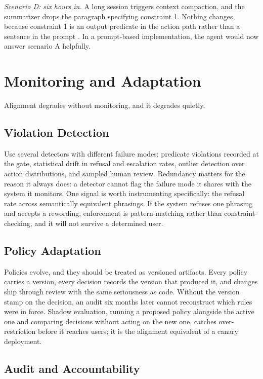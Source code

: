 \documentclass[11pt]{book}
\begin{document}
\textit{Scenario D: six hours in.} A long session triggers context compaction, and the summarizer drops the paragraph specifying constraint 1. Nothing changes, because constraint 1 is an output predicate in the action path rather than a sentence in the prompt \cite{govdecay2026}. In a prompt-based implementation, the agent would now answer scenario A helpfully.

\section{Monitoring and Adaptation}

Alignment degrades without monitoring, and it degrades quietly.

\subsection{Violation Detection}

Use several detectors with different failure modes: predicate violations recorded at the gate, statistical drift in refusal and escalation rates, outlier detection over action distributions, and sampled human review. Redundancy matters for the reason it always does: a detector cannot flag the failure mode it shares with the system it monitors. One signal is worth instrumenting specifically: the refusal rate across semantically equivalent phrasings. If the system refuses one phrasing and accepts a rewording, enforcement is pattern-matching rather than constraint-checking, and it will not survive a determined user.

\subsection{Policy Adaptation}

Policies evolve, and they should be treated as versioned artifacts. Every policy carries a version, every decision records the version that produced it, and changes ship through review with the same seriousness as code. Without the version stamp on the decision, an audit six months later cannot reconstruct which rules were in force. Shadow evaluation, running a proposed policy alongside the active one and comparing decisions without acting on the new one, catches over-restriction before it reaches users; it is the alignment equivalent of a canary deployment.

\subsection{Audit and Accountability}
\end{document}

